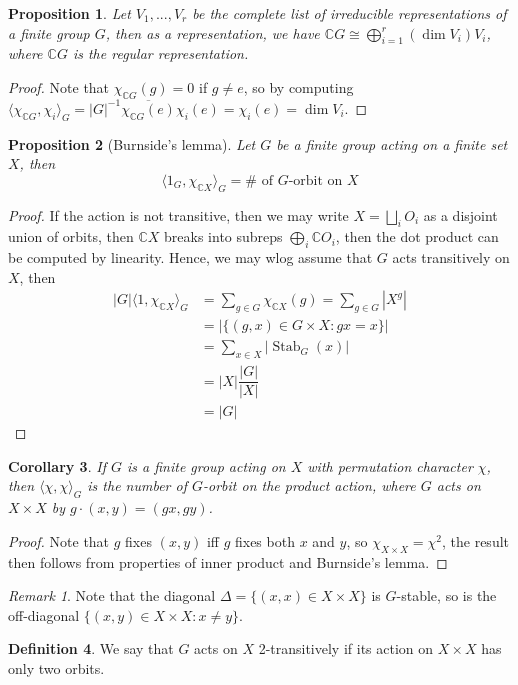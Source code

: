 \documentclass{article}
\theoremstyle{definition}
\newtheorem{defn}{Definition}[section]
\theoremstyle{remark}
\newtheorem{rem}{Remark}
\theoremstyle{plain}
\newtheorem{prop}[defn]{Proposition}
\newtheorem{crly}[defn]{Corollary}
\newcommand{\CC}{\mathbb{C}}
\begin{document}
\begin{prop}
    Let $V_1,...,V_r$ be the complete list of irreducible representations of a finite group $G$, then as a representation, we have $\CC G\cong\bigoplus_{i=1}^r(\dim V_i)V_i$, where $\CC G$ is the regular representation.
\end{prop}
\begin{proof}
    Note that $\chi_{\CC G}(g)=0$ if $g\neq e$, so by computing $\langle\chi_{\CC G},\chi_i\rangle_G=|G|^{-1}\overline{\chi_{\CC G}(e)}\chi_i(e)=\chi_i(e)=\dim V_i$.
\end{proof}
\begin{prop}[Burnside's lemma]
    Let $G$ be a finite group acting on a finite set $X$, then $$\langle 1_G,\chi_{\CC X}\rangle_G=\#\text{ of $G$-orbit on $X$}$$
\end{prop}
\begin{proof}
    If the action is not transitive, then we may write $X=\bigsqcup_iO_i$ as a disjoint union of orbits, then $\CC X$ breaks into subreps $\bigoplus_i \CC O_i$, then the dot product can be computed by linearity. Hence, we may wlog assume that $G$ acts transitively on $X$, then
    \begin{align*}
        |G|\langle1,\chi_{\CC X}\rangle_G&=\sum_{g\in G}\chi_{\CC X}(g)=\sum_{g\in G}|X^g|\\
        &=|\{(g,x)\in G\times X:gx=x\}|\\
        &=\sum_{x\in X}|\operatorname{Stab}_G(x)|\\
        &=|X|\dfrac{|G|}{|X|}\\
        &=|G|
    \end{align*}
\end{proof}

\begin{crly}
    If $G$ is a finite group acting on $X$ with permutation character $\chi$, then $\langle\chi,\chi\rangle_G$ is the number of $G$-orbit on the product action, where $G$ acts on $X\times X$ by $g\cdot (x,y)=(gx,gy)$.
\end{crly}
\begin{proof}
    Note that $g$ fixes $(x,y)$ iff $g$ fixes both $x$ and $y$, so $\chi_{X\times X}=\chi^2$, the result then follows from properties of inner product and Burnside's lemma.
\end{proof}
\begin{rem}
    Note that the diagonal $\Delta=\{(x,x)\in X\times X\}$ is $G$-stable, so is the off-diagonal $\{(x,y)\in X\times X:x\neq y\}$.
\end{rem}
\begin{defn}
    We say that $G$ acts on $X$ 2-transitively if its action on $X\times X$ has only two orbits. 
\end{defn}
\end{document}
